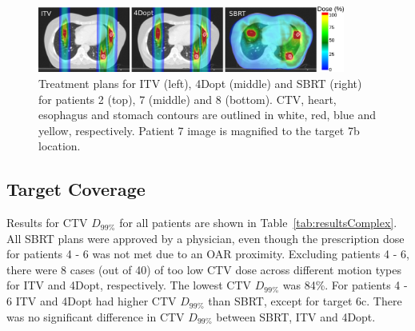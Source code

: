 \documentclass[type=dr, dr=rernat, accentcolor=tud7b,colorbacktitle, bigchapter, openright, twoside, 12pt ]{tudthesis}
\begin{document}
\newpage
\begin{figure}[H]
	\begin{center}
		\includegraphics[width=0.9\textwidth]{./Images/multiExample.png}
		\caption{Treatment plans for ITV (left), 4Dopt (middle) and SBRT (right) for patients 2 (top), 7 (middle) and 8 (bottom). 
		CTV, heart, esophagus and stomach contours are outlined in white, red, blue and yellow,
		respectively. Patient 7 image is magnified to the target 7b location.}
		\label{Fig:multiExample}
	\end{center}
\end{figure}
\newpage
\subsection{Target Coverage}

Results for CTV $D_{99\%}$ for all patients are shown in Table~\ref{tab:resultsComplex}. All SBRT plans were approved by a physician, 
even though the prescription dose for patients 4 - 6 was not met due to an OAR proximity. Excluding patients 4 - 6, there were 8 cases (out of 40) of too low CTV dose across different
motion types for ITV and 4Dopt, respectively. The lowest CTV $D_{99\%}$ was 84\%.
For patients 4 - 6 ITV and 4Dopt had higher CTV $D_{99\%}$ than SBRT, except for target 6c.
There was no significant difference in CTV $D_{99\%}$ between SBRT, ITV and 4Dopt.
\end{document}
